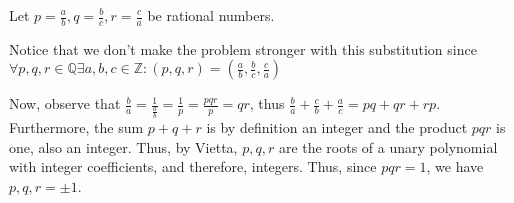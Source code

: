 \documentclass{article}
\begin{document}
Let \(p = \frac{a}{b} , q = \frac{b}{c} , r = \frac{c}{a}\) be rational numbers.

Notice that we don't make the problem stronger with this substitution since \(\forall p,q,r\in\mathbb{Q}\exists a,b,c\in\mathbb{Z}: \left(p,q,r\right)=\left(\frac{a}{b} , \frac{b}{c} , \frac{c}{a}\right)\)

Now, observe that \(\frac{b}{a} = \frac{1}{\frac{a}{b}} = \frac{1}{p} = \frac{pqr}{p} = qr\), thus \(\frac{b}{a} + \frac{c}{b} + \frac{a}{c} = pq+qr+rp\).
Furthermore, the sum \(p+q+r\) is by definition an integer and the product \(pqr\) is one, also an integer.
Thus, by Vietta, \(p,q,r\) are the roots of a unary polynomial with integer coefficients, and therefore, integers.
Thus, since \(pqr=1\), we have \(p,q,r=\pm1\).
\end{document}
